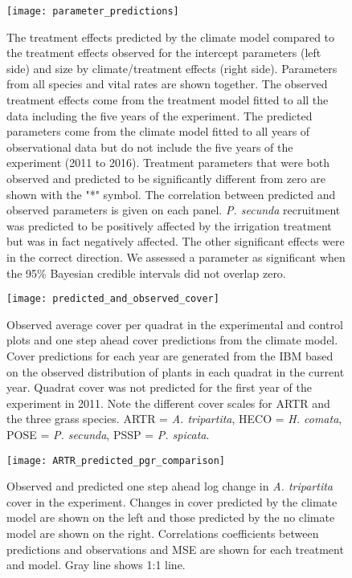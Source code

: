 \documentclass[11pt]{article}
\begin{document}
\begin{figure}[!htbp]
	\centering
	\texttt{[image: parameter\_predictions]}
	\caption{The treatment effects predicted by the climate model compared to the treatment effects observed for the intercept parameters (left side) and size by climate/treatment effects (right side). Parameters from all species and vital rates are shown together. The observed treatment effects come from the treatment model fitted to all the data including the five years of the experiment.  The predicted parameters come from the climate model fitted to all years of observational data but do not include the five years of the experiment (2011 to 2016).  Treatment parameters that were both observed and predicted to be significantly different from zero are shown with the "*" symbol. The correlation between predicted and observed parameters is given on each panel. \textit{P. secunda} recruitment was predicted to be positively affected by the irrigation treatment but was in fact negatively affected. The other significant effects were in the correct direction. We assessed a parameter as significant when the 95\% Bayesian credible intervals did not overlap zero.}
	\label{fig:parPredictions}
\end{figure}

\begin{figure}[!htbp]
	\centering
	\texttt{[image: predicted\_and\_observed\_cover]}
	\caption{Observed average cover per quadrat in the experimental and control plots and one step ahead cover predictions from the climate model. Cover predictions for each year are generated from the IBM based on the observed distribution of plants in each quadrat in the current year. Quadrat cover was not predicted for the first year of the experiment in 2011.  Note the different cover scales for ARTR and the three grass species. ARTR = \textit{A. tripartita}, HECO = \textit{H. comata}, POSE = \textit{P. secunda}, PSSP = \textit{P. spicata}.}
	\label{fig:coverPred}
\end{figure}


\begin{figure}[!htbp]
	\centering
	\texttt{[image: ARTR\_predicted\_pgr\_comparison]}
	\caption{Observed and predicted one step ahead log change in \textit{A. tripartita} cover in the experiment. Changes in cover predicted by the climate model are shown on the left and those predicted by the no climate model are shown on the right. Correlations coefficients between predictions and observations and MSE are shown for each treatment and model. Gray line shows 1:1 line.}
	\label{fig:pgrARTR}
\end{figure}
\end{document}
